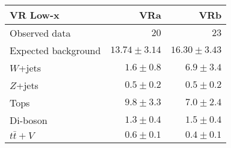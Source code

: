 \begin{table}
  \begin{center}
    \caption{ \label{tab::BGestimation::VRyields_Lowx}   }

    \begin{tabular*}{\textwidth}{@{\extracolsep{\fill}}lrr}
      \toprule
      \textbf{VR Low-x} & VRa & VRb \\
      \midrule

Observed data & $20$ & $23$ \\
\midrule
Expected background & $13.74 \pm 3.14$ & $16.30 \pm 3.43$ \\
\midrule
$W$+jets & $1.6 \pm 0.8$ & $6.9 \pm 3.4$ \\
$Z$+jets & $0.5 \pm 0.2$ & $0.5 \pm 0.2$ \\
Tops & $9.8 \pm 3.3$ & $7.0 \pm 2.4$ \\
Di-boson & $1.3 \pm 0.4$ & $1.5 \pm 0.4$ \\
$t\bar{t}+V$ & $0.6 \pm 0.1$ & $0.4 \pm 0.1$ \\
        \bottomrule
        \end{tabular*}

  \end{center}
\end{table}



